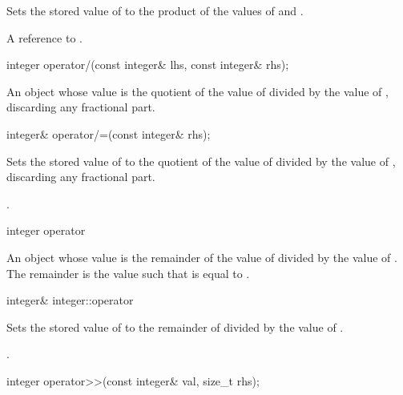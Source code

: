 \begin{itemdescr}
\effects Sets the stored value of  to the product of the values of  and .

\returns A reference to .		
\end{itemdescr}

\begin{itemdecl}
integer operator/(const integer& lhs, const integer& rhs);	
\end{itemdecl}

\begin{itemdescr}
\returns An object whose value is the quotient of the value of  divided by the value of , discarding any fractional part.		
\end{itemdescr}

\begin{itemdecl}
integer& operator/=(const integer& rhs);	
\end{itemdecl}

\begin{itemdescr}
\effects Sets the stored value of  to the quotient of the value of  divided by the value of , discarding any fractional part.

\returns {}.		
\end{itemdescr}

\begin{itemdecl}
integer operator%
\end{itemdecl}

\begin{itemdescr}
\returns An object whose value is the remainder of the value of  divided by the value of . The remainder is the value such that  is equal to .		
\end{itemdescr}

\begin{itemdecl}
integer& integer::operator%
\end{itemdecl}

\begin{itemdescr}
\effects Sets the stored value of  to the remainder of  divided by the value of .

\returns {}.		
\end{itemdescr}

\begin{itemdecl}
integer operator>>(const integer& val, size_t rhs);	
\end{itemdecl}

